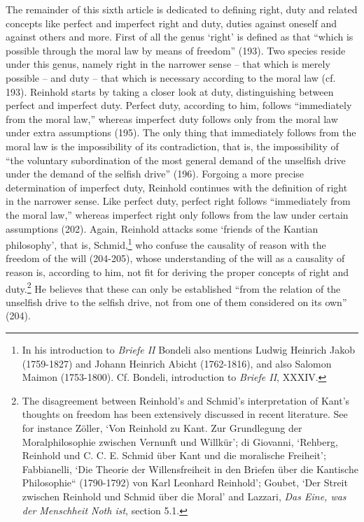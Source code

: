  The remainder of this sixth article is dedicated to defining right, duty and related concepts like perfect and imperfect right and duty, duties against oneself and against others and more. First of all the genus `right' is defined as that ``which is possible through the moral law by means of freedom'' (193). Two species reside under this genus, namely right in the narrower sense {--} that which is merely possible {--} and duty {--} that which is necessary according to the moral law (cf. 193). Reinhold starts by taking a closer look at duty, distinguishing between perfect and imperfect duty. Perfect duty, according to him, follows ``immediately from the moral law,'' whereas imperfect duty follows only from the moral law under extra assumptions (195). The only thing that immediately follows from the moral law is the impossibility of its contradiction, that is, the impossibility of ``the voluntary subordination of the most general demand of the unselfish drive under the demand of the selfish drive'' (196). Forgoing a more precise determination of imperfect duty, Reinhold continues with the definition of right in the narrower sense. Like perfect duty, perfect right follows ``immediately from the moral law,'' whereas imperfect right only follows from the law under certain assumptions (202). Again, Reinhold attacks some `friends of the Kantian philosophy', that is, Schmid,\footnote{ In his introduction to \textit{Briefe II} Bondeli also mentions Ludwig Heinrich Jakob (1759{-}1827) and Johann Heinrich Abicht (1762{-}1816), and also Salomon Maimon (1753{-}1800). Cf. Bondeli, introduction to \textit{Briefe II}, XXXIV. } who confuse the causality of reason with the freedom of the will (204{-}205), whose understanding of the will as a causality of reason is, according to him, not fit for deriving the proper concepts of right and duty.\footnote{ The disagreement between Reinhold's and Schmid's interpretation of Kant's thoughts on freedom has been extensively discussed in recent literature. See for instance Z\"{o}ller, `Von Reinhold zu Kant. Zur Grundlegung der Moralphilosophie zwischen Vernunft und Willk\"{u}r'; di Giovanni, `Rehberg, Reinhold und C. C. E. Schmid \"{u}ber Kant und die moralische Freiheit'; Fabbianelli, `Die Theorie der Willensfreiheit in den \quotedblbase Briefen \"{u}ber die Kantische Philosophie`` (1790{-}1792) von Karl Leonhard Reinhold';  Goubet, `Der Streit zwischen Reinhold und Schmid \"{u}ber die Moral' and Lazzari, \textit{Das Eine, was der Menschheit Noth ist}, section 5.1. } He believes that these can only be established ``from the relation of the unselfish drive to the selfish drive, not from one of them considered on its own'' (204). 

